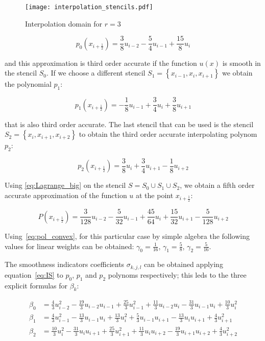 \begin{figure}
   \centering
   \texttt{[image: interpolation\_stencils.pdf]}
   \label{fig:stencils_3}
   \caption{Interpolation domain for $r=3$}
\end{figure}

\begin{equation}
  \label{eq:pol_0}
  p_0(x_{i+\frac{1}{2}}) = \frac{3}{8} u_{i-2} - \frac{5}{4} u_{i-1} + \frac{15}{8} u_i
\end{equation}

and this approximation is third order accurate if the function $u(x)$ is smooth in the stencil $S_0$. If we choose a different stencil $S_1=\left\{ x_{i-1}, x_{i}, x_{i+1} \right\}$ we obtain the polynomial $p_1$:

\begin{equation}
  \label{eq:pol_1}
  p_1(x_{i+\frac{1}{2}}) = -\frac{1}{8} u_{i-1} + \frac{3}{4} u_i + \frac{3}{8} u_{i+1}
\end{equation}

that is also third order accurate. The last stencil that can be used is the stencil $S_2=\left\{ x_{i}, x_{i+1}, x_{i+2} \right\}$ to obtain the third order accurate interpolating polynom $p_2$:

\begin{equation}
  \label{eq:pol_2}
  p_2(x_{i+\frac{1}{2}}) = \frac{3}{8} u_i + \frac{3}{4} u_{i+1} - \frac{1}{8} u_{i+2}
\end{equation}

Using \eqref{eq:Lagrange_big} on the stencil $S= S_0 \cup S_1 \cup S_2$, we obtain a fifth order accurate approximation of the function $u$ at the point $x_{i+\frac{1}{2}}$:

\begin{equation}
  \label{eq:pol_union}
  P(x_{i+\frac{1}{2}}) = \frac{3}{128} u_{i-2} - \frac{5}{32} u_{i-1} + \frac{45}{64} u_i + \frac{15}{32} u_{i+1} - \frac{5}{128} u_{i+2}
\end{equation}

Using~\ref{eq:pol_convex}, for this particular case by simple algebra the following values for linear weights can be obtained: $\gamma_0 = \frac{1}{16}$, $\gamma_1 = \frac{5}{8}$, $\gamma_2 = \frac{5}{16}$.

The smoothness indicators coefficients $\sigma_{k,j,l}$ can be obtained applying equation~\ref{eq:IS} to $p_0$, $p_1$ and $p_2$ polynoms respectively; this leds to the three explicit formulas for $\beta_k$:

\begin{align}
   \beta_0 & = \frac{ 4}{3} u_{i-2}^2 - \frac{19}{3} u_{i-2} u_{i-1} + \frac{25}{3} u_{i-1}^2 + \frac{11}{3} u_{i-2} u_{i  } -\frac{31}{3} u_{i-1} u_{i  } + \frac{10}{3} u_{i  }^2 \\
   \beta_1 & = \frac{ 4}{3} u_{i-1}^2 - \frac{13}{3} u_{i-1} u_{i  } + \frac{13}{3} u_{i  }^2 + \frac{ 5}{3} u_{i-1} u_{i+1} -\frac{13}{3} u_{i  } u_{i+1} + \frac{ 4}{3} u_{i+1}^2 \\
   \beta_2 & = \frac{10}{3} u_{i  }^2 - \frac{31}{3} u_{i  } u_{i+1} + \frac{25}{3} u_{i+1}^2 + \frac{11}{3} u_{i  } u_{i+2} -\frac{19}{3} u_{i+1} u_{i+2} + \frac{ 4}{3} u_{i+2}^2
\end{align}
